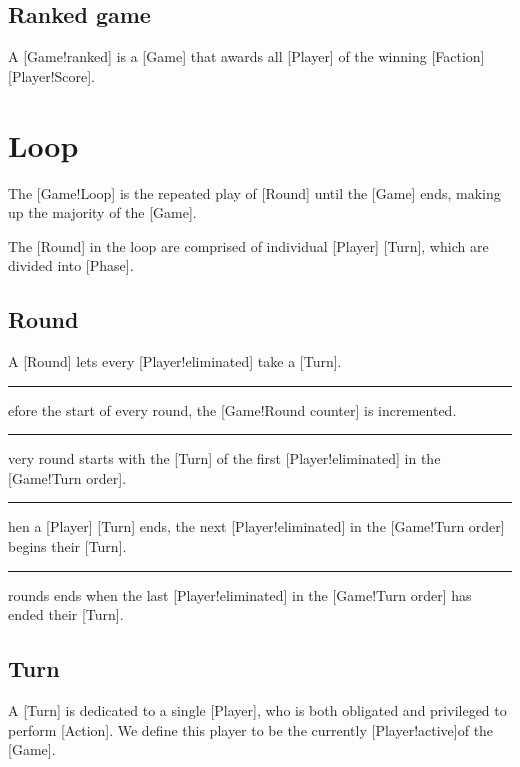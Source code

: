 \subsection{Ranked game}

A [Game!ranked] is a [Game] that awards all [Player] of the winning [Faction] [Player!Score].

\section{Loop}

The [Game!Loop] is the repeated play of [Round] until the [Game] ends, making up the majority of the [Game].

The [Round] in the loop are comprised of individual [Player] [Turn], which are divided into [Phase].

\subsection{Round}

A [Round] lets every [Player!eliminated] take a [Turn].

\begin{rules}
    \rule{round.pre} Before the start of every round, the [Game!Round counter] is incremented.
    \rule{round.start} Every round starts with the [Turn] of the first [Player!eliminated] in the [Game!Turn order].
    \rule{round.next} When a [Player] [Turn] ends, the next [Player!eliminated] in the [Game!Turn order] begins their [Turn].
    \rule{round.end} A rounds ends when the last [Player!eliminated] in the [Game!Turn order] has ended their [Turn].
\end{rules}

\subsection{Turn}

A [Turn] is dedicated to a single [Player], who is both obligated and privileged to perform [Action].
We define this player to be the currently [Player!active]of the [Game].

